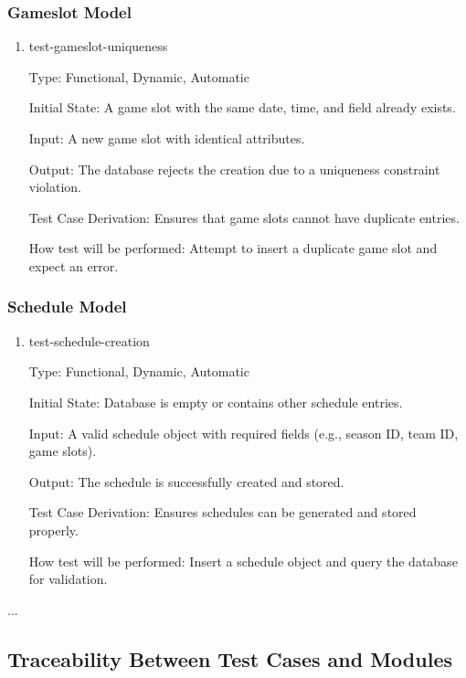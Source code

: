 \documentclass[12pt, titlepage]{article}
\begin{document}
\subsubsection{Gameslot Model}

\begin{enumerate}

    \item{test-gameslot-uniqueness\\}

    Type: Functional, Dynamic, Automatic

    Initial State: A game slot with the same date, time, and field already exists.

    Input: A new game slot with identical attributes.

    Output: The database rejects the creation due to a uniqueness constraint violation.

    Test Case Derivation: Ensures that game slots cannot have duplicate entries.

    How test will be performed: Attempt to insert a duplicate game slot and expect an error.
\end{enumerate}

\subsubsection{Schedule Model}

\begin{enumerate}


\item{test-schedule-creation\\}

      Type: Functional, Dynamic, Automatic

      Initial State: Database is empty or contains other schedule entries.

      Input: A valid schedule object with required fields (e.g., season ID, team ID, game slots).

      Output: The schedule is successfully created and stored.

      Test Case Derivation: Ensures schedules can be generated and stored properly.

      How test will be performed: Insert a schedule object and query the database for validation.
\end{enumerate}


...

\subsection{Traceability Between Test Cases and Modules}
\end{document}
